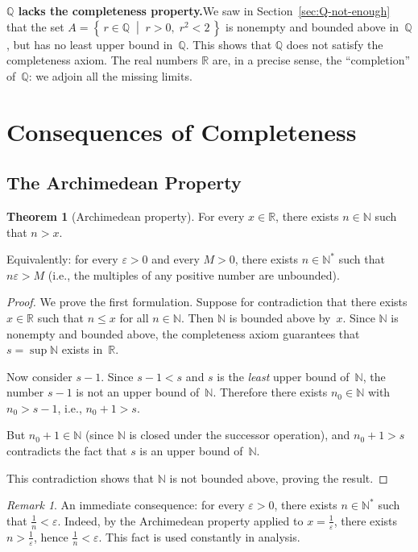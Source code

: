 \documentclass[12pt,a4paper,openany]{book}
\newcommand{\N}{\mathbb{N}}
\newcommand{\Q}{\mathbb{Q}}
\newcommand{\R}{\mathbb{R}}
\newcommand{\eps}{\varepsilon}
\newcommand{\setcond}[2]{\left\{\,#1\;\middle|\;#2\,\right\}}
\theoremstyle{definition}
\newtheorem{theorem}{Theorem}[chapter]
\theoremstyle{remark}
\newtheorem{remark}{Remark}[chapter]
\begin{document}
\medskip

\textbf{$\Q$ lacks the completeness property.}\quad We saw in
Section~\ref{sec:Q-not-enough} that the set
$A = \setcond{r \in \Q}{r>0,\; r^2<2}$ is nonempty and bounded above
in~$\Q$, but has no least upper bound in~$\Q$.  This shows that $\Q$ does
not satisfy the completeness axiom.  The real numbers $\R$ are, in a precise
sense, the ``completion'' of~$\Q$: we adjoin all the missing limits.

\section{Consequences of Completeness}
\label{sec:consequences}

\subsection{The Archimedean Property}
\label{subsec:archimedean}

\begin{theorem}[Archimedean property]\label{thm:archimedean}
For every $x \in \R$, there exists $n \in \N$ such that $n > x$.

Equivalently: for every $\eps > 0$ and every $M > 0$, there exists
$n \in \N^*$ such that $n\eps > M$ (i.e., the multiples of any positive
number are unbounded).
\end{theorem}

\begin{proof}
We prove the first formulation.  Suppose for contradiction that there
exists $x \in \R$ such that $n \leq x$ for all $n \in \N$.  Then $\N$ is
bounded above by~$x$.  Since $\N$ is nonempty and bounded above, the
completeness axiom guarantees that $s = \sup \N$ exists in~$\R$.

Now consider $s - 1$.  Since $s-1 < s$ and $s$ is the \emph{least} upper
bound of~$\N$, the number $s-1$ is not an upper bound of~$\N$.  Therefore
there exists $n_0 \in \N$ with $n_0 > s-1$, i.e., $n_0 + 1 > s$.

But $n_0 + 1 \in \N$ (since $\N$ is closed under the successor operation),
and $n_0 + 1 > s$ contradicts the fact that $s$ is an upper bound of~$\N$.

This contradiction shows that $\N$ is not bounded above, proving the result.
\end{proof}

\begin{remark}
An immediate consequence: for every $\eps > 0$, there exists $n \in \N^*$
such that $\frac{1}{n} < \eps$.  Indeed, by the Archimedean property applied
to $x = \frac{1}{\eps}$, there exists $n > \frac{1}{\eps}$, hence
$\frac{1}{n} < \eps$.  This fact is used constantly in analysis.
\end{remark}
\end{document}
